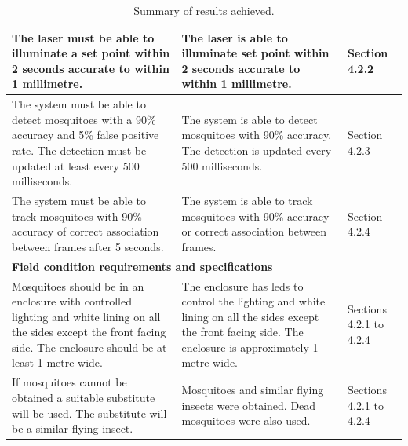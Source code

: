 \begin{table}[!htb]
\begin{tabularx}{\textwidth}{|X|X|l|}
    \hline
    The laser must be able to illuminate a set point within 2 seconds accurate to within 1 millimetre.                                                                           &
    The laser is able to illuminate set point within 2 seconds accurate to within 1 millimetre.                                                                                  &
    Section 4.2.2                                                                                                                                                                                                                                                                                                                                                 \\
    \hline
    The system must be able to detect mosquitoes with a 90\% accuracy and 5\% false positive rate. The detection must be updated at least every 500 milliseconds.                & The system is able to detect mosquitoes with 90\% accuracy. The detection is updated every 500 milliseconds.                                         & Section 4.2.3           \\
    \hline
    The system must be able to track mosquitoes with 90\% accuracy of correct association between frames after 5 seconds.                                                        & The system is able to track mosquitoes with 90\% accuracy or correct association between frames.                                                     & Section 4.2.4           \\
    \hline
    \multicolumn{3}{|l|}{\textbf{Field condition requirements and specifications}}                                                                                                                                                                                                                                                                                \\
    \hline
    Mosquitoes should be in an enclosure with controlled lighting and white lining on all the sides except the front facing side. The enclosure should be at least 1 metre wide. & The enclosure has \glspl{led} to control the lighting and white lining on all the sides except the front facing side. The enclosure is approximately 1 metre wide. & Sections 4.2.1 to 4.2.4 \\
    \hline
    If mosquitoes cannot be obtained a suitable substitute will be used. The substitute will be a similar flying insect.                                                         & Mosquitoes and similar flying insects were obtained. Dead mosquitoes were also used.                                                                 & Sections 4.2.1 to 4.2.4 \\
    \hline
  \end{tabularx}
  \caption{Summary of results achieved.}
  \label{tab:results_summary}
\end{table}


